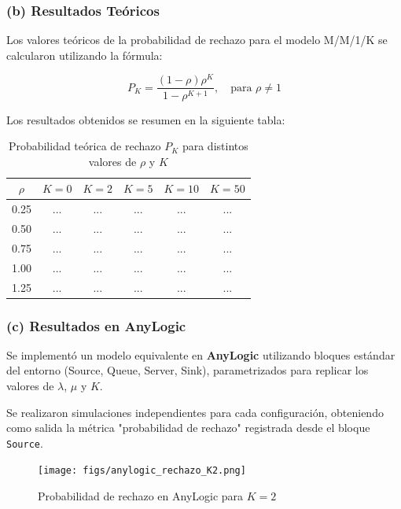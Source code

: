 \documentclass[12pt]{article}
\begin{document}
\subsubsection*{(b) Resultados Teóricos}

Los valores teóricos de la probabilidad de rechazo para el modelo M/M/1/K se calcularon utilizando la fórmula:

\[
P_K = \frac{(1 - \rho) \rho^K}{1 - \rho^{K+1}}, \quad \text{para } \rho \neq 1
\]

Los resultados obtenidos se resumen en la siguiente tabla:

\begin{table}[H]
\centering
\begin{tabular}{|c|c|c|c|c|c|}
\hline
\( \rho \) & \( K=0 \) & \( K=2 \) & \( K=5 \) & \( K=10 \) & \( K=50 \) \\
\hline
0.25 & ... & ... & ... & ... & ... \\
0.50 & ... & ... & ... & ... & ... \\
0.75 & ... & ... & ... & ... & ... \\
1.00 & ... & ... & ... & ... & ... \\
1.25 & ... & ... & ... & ... & ... \\
\hline
\end{tabular}
\caption{Probabilidad teórica de rechazo \( P_K \) para distintos valores de \( \rho \) y \( K \)}
\end{table}

\subsubsection*{(c) Resultados en AnyLogic}

Se implementó un modelo equivalente en \textbf{AnyLogic} utilizando bloques estándar del entorno (Source, Queue, Server, Sink), parametrizados para replicar los valores de \( \lambda \), \( \mu \) y \( K \).

Se realizaron simulaciones independientes para cada configuración, obteniendo como salida la métrica "probabilidad de rechazo" registrada desde el bloque \texttt{Source}.

\begin{figure}[H]
    \centering
    \texttt{[image: figs/anylogic\_rechazo\_K2.png]}
    \caption{Probabilidad de rechazo en AnyLogic para \( K = 2 \)}
\end{figure}

\end{document}
